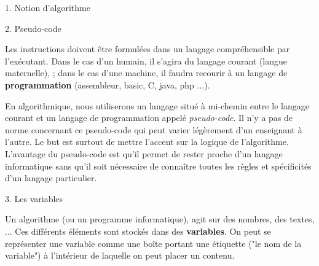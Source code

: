 
\begin{h2}1. Notion d'algorithme\end{h2}
\begin{h2}2. Pseudo-code\end{h2}
Les instructions doivent être formulées dans un langage compréhensible par l'exécutant. Dans le cas d'un humain, il s'agira du langage courant (langue maternelle), ; dans le cas d'une machine, il faudra recourir à un langage de \textbf{programmation} (assembleur, basic, C, java, php ...).
\par
En algorithmique, nous utiliserons un langage situé à mi-chemin entre le langage courant et un langage de programmation appelé \textit{pseudo-code}. Il n'y a pas de norme concernant ce pseudo-code qui peut varier légèrement d'un enseignant à l'autre. Le but est surtout de mettre l'accent sur la logique de l'algorithme. L'avantage du pseudo-code est qu'il permet de rester proche d'un langage informatique sans qu'il soit nécessaire de connaître toutes les règles et spécificités d'un langage particulier.
\begin{h2}3. Les variables\end{h2}
Un algorithme (ou un programme informatique), agit sur des nombres, des textes, ... Ces différents éléments sont stockés dans des \textbf{variables}. On peut se représenter une variable comme une boîte portant une étiquette ("le nom de la variable") à l'intérieur de laquelle on peut placer un contenu.
